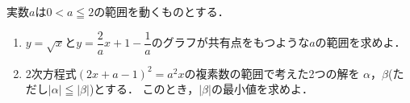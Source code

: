 \documentclass[../../main.tex]{subfiles}
\begin{document}
実数$a$は$0<a\leqq2$の範囲を動くものとする．
\begin{enumerate}
  \item $y=\sqrt x$と$\displaystyle y=\dfrac{2}{a}x+1-\dfrac{1}{a}$のグラフが共有点をもつような$a$の範囲を求めよ．
  \item 2次方程式${(2x+a-1)}^2=a^2x$の複素数の範囲で考えた2つの解を
    $\alpha$，$\beta$(ただし$|\alpha|\leqq|\beta|$)とする．
    このとき，$|\beta|$の最小値を求めよ．
\end{enumerate}
\end{document}
